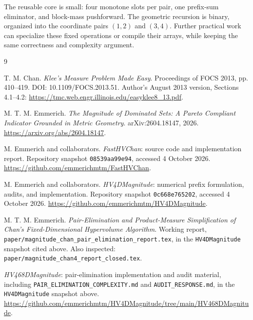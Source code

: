 \documentclass[12pt,a4paper]{article}
\theoremstyle{remark}
\newcommand{\1}{\mathbf1}
\begin{document}
The reusable core is small: four monotone slots per pair, one prefix-sum
eliminator, and block-mass pushforward. The geometric recursion is binary,
organized into the coordinate pairs $(1,2)$ and $(3,4)$. Further practical
work can specialize these fixed operations or compile their arrays, while
keeping the same correctness and complexity argument.

\begin{thebibliography}{9}
\raggedright
{}
T. M. Chan. \emph{Klee's Measure Problem Made Easy}.
Proceedings of FOCS 2013, pp. 410--419.
DOI: 10.1109/FOCS.2013.51.
Author's August 2013 version, Sections 4.1--4.2:
\url{https://tmc.web.engr.illinois.edu/easyklee8_13.pdf}.

M. T. M. Emmerich. \emph{The Magnitude of Dominated Sets: A Pareto Compliant
Indicator Grounded in Metric Geometry}. arXiv:2604.18147, 2026.
\url{https://arxiv.org/abs/2604.18147}.

M. Emmerich and collaborators. \emph{FastHVChan}: source code and
implementation report. Repository snapshot \texttt{08539aa99e94},
accessed 4 October 2026.
\url{https://github.com/emmerichmtm/FastHVChan}.

M. Emmerich and collaborators. \emph{HV4DMagnitude}: numerical prefix
formulation, audits, and implementation. Repository snapshot
\texttt{0c668e765202}, accessed 4 October 2026.
\url{https://github.com/emmerichmtm/HV4DMagnitude}.

M. T. M. Emmerich. \emph{Pair-Elimination and Product-Measure Simplification
of Chan's Fixed-Dimensional Hypervolume Algorithm}. Working report,
\texttt{paper/magnitude\_chan\_pair\_elimination\_report.tex}, in
the \texttt{HV4DMagnitude} snapshot cited above. Also inspected:
\texttt{paper/magnitude\_chan4\_report\_closed.tex}.

\emph{HV468DMagnitude}: pair-elimination implementation and audit material,
including \texttt{PAIR\_ELIMINATION\_COMPLEXITY.md} and
\texttt{AUDIT\_RESPONSE.md}, in the \texttt{HV4DMagnitude} snapshot above.
\url{https://github.com/emmerichmtm/HV4DMagnitude/tree/main/HV468DMagnitude}.
\end{thebibliography}
\end{document}
